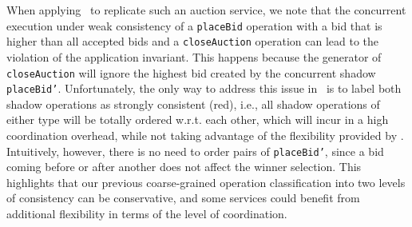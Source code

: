 When applying \RBCN\ to replicate such an auction service, we note that the concurrent execution
under weak consistency of a {\tt placeBid} operation with a bid
that is higher than all accepted bids and a {\tt closeAuction} operation
can lead to the violation of the application invariant.
This happens because the generator of {\tt closeAuction} will ignore the highest bid created by
the concurrent shadow {\tt placeBid'}. Unfortunately,
the only way to address this issue in \RBCN\ is to label
both shadow operations as strongly consistent (red), i.e.,
all shadow operations of either type will be totally ordered w.r.t. each other,
which will incur in a high coordination overhead, while not taking advantage of the flexibility provided by \RBCN.
Intuitively, however, there is no need to order pairs of {\tt placeBid'},
since a bid coming before or after another does not affect the winner selection.
This highlights that our previous coarse-grained operation classification into
two levels of consistency can be conservative, and some services could benefit
from additional flexibility in terms of the level of coordination.

